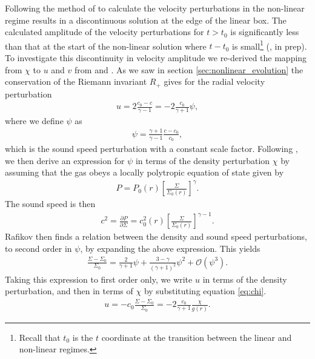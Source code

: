 Following the method of \citet{bollati2021} to calculate the velocity perturbations in the non-linear regime results in a discontinuous solution at the edge of the linear box. 
The calculated amplitude of the velocity perturbations for $t>t_0$ is significantly less than that at the start of the non-linear solution where $t-t_0$ is small\footnote{Recall that $t_0$ is the $t$ coordinate at the transition between the linear and non-linear regimes.} (\citeauthor{fasanoinprep.}, in prep).
To investigate this discontinuity in velocity amplitude we re-derived the mapping from $\chi$ to $u$ and $v$ from \citet{rafikov2002a} and \citet{bollati2021}.
As we saw in section \ref{sec:nonlinear_evolution} the conservation of the Riemann invariant $R_+$ gives for the radial velocity perturbation
\begin{align}
    u = 2\frac{c_0-c}{\gamma - 1}=-2\frac{c_0}{\gamma + 1} \psi, \label{eq:u_rafikov}
\end{align}
where we define $\psi$ as
\begin{align}
    \psi = \frac{\gamma+1}{\gamma-1} \frac{c - c_0}{c_0},
\end{align}
which is the sound speed perturbation with a constant scale factor. Following \citet{rafikov2002a}, we then derive an expression for $\psi$ in terms of the density perturbation $\chi$ by assuming that the gas obeys a locally polytropic equation of state given by 
\begin{align}
    P = P_0(r) \left[ \frac{\Sigma}{\Sigma_0(r)} \right]^\gamma. \label{eq:poly_EOS}
\end{align}
The sound speed is then
\begin{align}
    c^2 = \frac{\partial P}{\partial \Sigma} = c_0^2(r) \left[ \frac{\Sigma}{\Sigma_0(r)} \right]^{\gamma-1}.
\end{align}
Rafikov then finds a relation between the density and sound speed perturbations, to second order in $\psi$, by expanding the above expression. 
This yields
\begin{align}
    \frac{\Sigma - \Sigma_0}{\Sigma_0} = \frac{2}{\gamma + 1}\psi + \frac{3 - \gamma}{\left( \gamma + 1  \right)^2} \psi^2 + \mathcal{O}(\psi^3). \label{eq:psi_exp}
\end{align}
Taking this expression to first order only, we write $u$ in terms of the density perturbation, and then in terms of $\chi$ by substituting equation \ref{eq:chi}. 
\begin{align}
    u = - c_0 \frac{\Sigma - \Sigma_0}{\Sigma_0} = -2 \frac{c_0}{\gamma + 1} \frac{\chi}{g(r)}. \label{eq:ap_rad_vel}
\end{align}
